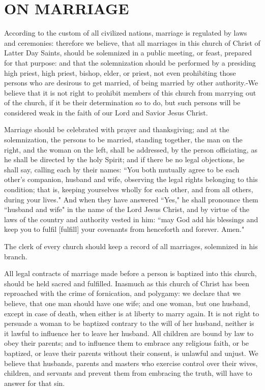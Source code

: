 \chapter{ON MARRIAGE}
\label{chap:marriage}

According to the custom of all civilized nations, marriage is regulated by laws and
ceremonies: therefore we believe, that all marriages in this church of Christ of
Latter Day Saints, should be solemnized in a public meeting, or feast, prepared for
that purpose: and that the solemnization should be performed by a presiding high
priest, high priest, bishop, elder, or priest, not even prohibiting those persons who
are desirous to get married, of being married by other authority.-We believe that it
is not right to prohibit members of this church from marrying out of the church, if
it be their determination so to do, but such persons will be considered weak in the
faith of our Lord and Savior Jesus Christ.

Marriage should be celebrated with prayer and thanksgiving; and at the solemnization,
the persons to be married, standing together, the man on the right, and the woman on
the left, shall be addressed, by the person officiating, as he shall be directed by
the holy Spirit; and if there be no legal objections, he shall say, calling each by
their names: ``You both mutually agree to be each other's companion, husband and wife,
observing the legal rights belonging to this condition; that is, keeping yourselves
wholly for each other, and from all others, during your lives." And when they have
answered ``Yes," he shall pronounce them ``husband and wife" in the name of the Lord
Jesus Christ, and by virtue of the laws of the country and authority vested in him:
``may God add his blessings and keep you to fulfil [fulfill] your covenants from
henceforth and forever. Amen."

The clerk of every church should keep a record of all marriages, solemnized in his 
branch.

All legal contracts of marriage made before a person is baptized into this church,
should be held sacred and fulfilled. Inasmuch as this church of Christ has been
reproached with the crime of fornication, and polygamy: we declare that we believe,
that one man should have one wife; and one woman, but one husband, except in case of
death, when either is at liberty to marry again. It is not right to persuade a woman
to be baptized contrary to the will of her husband, neither is it lawful to influence
her to leave her husband. All children are bound by law to obey their parents; and to
influence them to embrace any religious faith, or be baptized, or leave their parents
without their consent, is unlawful and unjust. We believe that husbands, parents and
masters who exercise control over their wives, children, and servants and prevent
them from embracing the truth, will have to answer for that sin.

